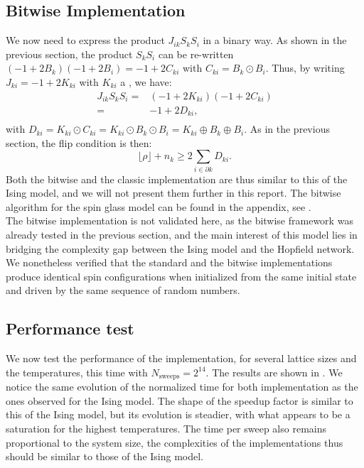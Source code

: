 \subsection{Bitwise Implementation}
\myindent We now need to express the product $J_{ik}S_kS_i$ in a binary way. As shown in the previous section, the product $S_kS_i$ can be re-written $(-1+2B_k)(-1+2B_i)=-1+2 C_{ki}$ with $C_{ki}= B_k \odot B_i$. Thus, by writing $J_{ki}=-1+2K_{ki}$ with $K_{ki}$ a \Bits, we have:
\begin{equation*}
  \begin{aligned}
  J_{ik}S_kS_i =& (-1+2K_{ki})(-1+2 C_{ki})\\
               =& -1 + 2D_{ki},\\
  \end{aligned}
\end{equation*}
with $D_{ki}=K_{ki}\odot C_{ki}= K_{ki} \odot B_k \odot B_i =  K_{ki} \oplus B_k \oplus B_i$. As in the previous section, the flip condition is then:
\begin{equation}
  \lfloor \rho \rfloor + n_k \geq 2 \sum_{i \in \partial k}D_{ki}.
  \label{eq:flip_SG_bitwise}
\end{equation}
Both the bitwise and the classic implementation are thus similar to this of the Ising model, and we will not present them further in this report. The bitwise algorithm for the spin glass model can be found in the appendix, see .\\
The bitwise implementation is not validated here, as the bitwise framework was already tested in the previous section, and the main interest of this model lies in bridging the complexity gap between the Ising model and the Hopfield network. We nonetheless verified that the standard and the bitwise implementations produce identical spin configurations when initialized from the same initial state and driven by the same sequence of random numbers.

\subsection{Performance test}
\myindent We now test the performance of the implementation, for several lattice sizes and the temperatures, this time with $N_\text{sweeps}=2^{14}$. The results are shown in . We notice the same evolution of the normalized time for both implementation as the ones observed for the Ising model. The shape of the speedup factor is similar to this of the Ising model, but its evolution is steadier, with what appears to be a saturation for the highest temperatures. The time per sweep also remains proportional to the system size, the complexities of the implementations thus should be similar to those of the Ising model.


